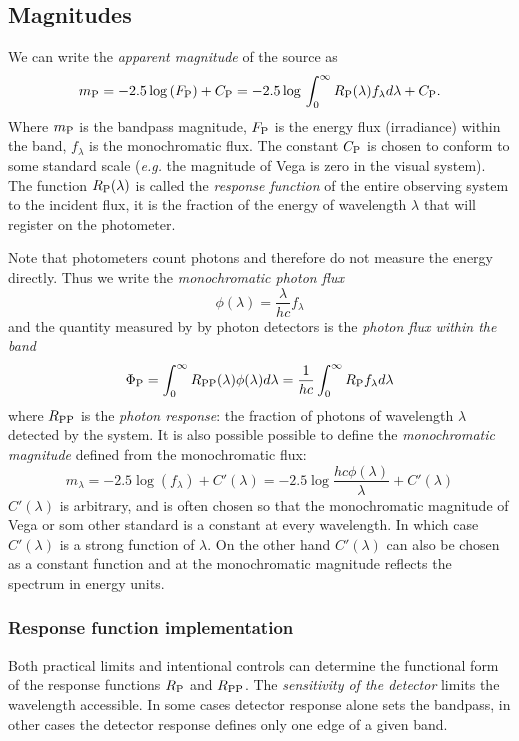 \documentclass{article}
\begin{document}
\subsection{Magnitudes}
We can write the {\it apparent magnitude} of the source as 
\[
m_{\rm P}=-2.5\log{(F_{\rm P})}+C_{\rm
  P}=-2.5\log{}\int_0^\infty R_{\rm P}(\lambda)f_\lambda
d\lambda+C_{\rm P}.
\]
Where $m_{\rm P}$ is the bandpass magnitude, $F_{\rm P}$ is the energy
flux (irradiance) within the band, $f_\lambda$ is the monochromatic
flux. The constant $C_{\rm P}$ is chosen to conform to some standard
scale ({\it e.g.} the magnitude of Vega is zero in the visual
system). The function $R_{\rm P}(\lambda)$ is called the {\it response
  function} of the entire observing system to the incident flux, it is
the fraction of the energy of wavelength $\lambda$ that will register
on the photometer.

Note that photometers count photons and therefore do not measure the
energy directly. Thus we write the {\it monochromatic photon flux} 
\[
\phi(\lambda)=\frac{\lambda}{hc}f_\lambda
\]
and the quantity measured by by photon detectors is the {\it photon
  flux within the band}
\[
\Phi_{\rm P}=\int_0^\infty R_{\rm
  PP}(\lambda)\phi(\lambda)d\lambda=\frac{1}{hc}\int_0^\infty R_{\rm
  P}f_\lambda d\lambda
\]
where $R_{\rm PP}$ is the {\it photon response}: the fraction of
photons of wavelength $\lambda$ detected by the system. It is also
possible possible to define the {\it monochromatic magnitude} defined
from the monochromatic flux:
\[
m_\lambda=-2.5\log{(f_\lambda)}+C'(\lambda)=-2.5\log{\frac{hc\phi(\lambda)}{\lambda}}+C'(\lambda)
\]
$C'(\lambda)$ is arbitrary, and is often chosen so that the
monochromatic magnitude of Vega or som other standard is a constant
at every wavelength. In which case $C'(\lambda)$ is a strong function
of $\lambda$. On the other hand $C'(\lambda)$ can also be chosen as a
constant function and at the monochromatic magnitude reflects the
spectrum in energy units. 
\subsubsection{Response function implementation} 
Both practical limits and intentional controls can determine the
functional form of the response functions $R_{\rm P}$ and $R_{\rm
  PP}$. The {\it sensitivity of the detector} limits the wavelength
accessible. In some cases detector response alone sets the bandpass, in
other cases the detector response defines only one edge of a given
band. 
\end{document}
